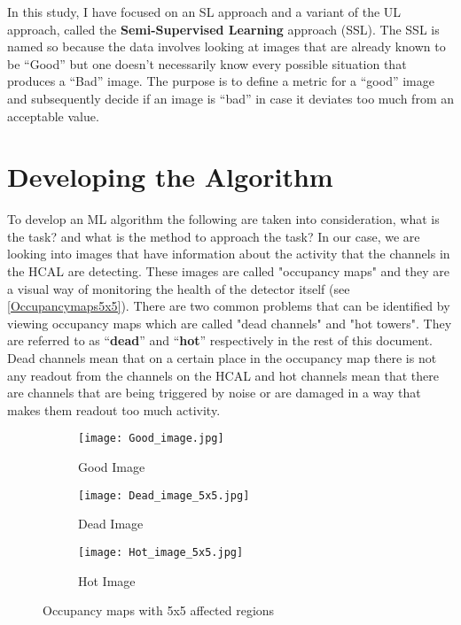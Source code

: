 In this study, I have focused on an SL approach and a variant of the UL approach, called the \textbf{Semi-Supervised Learning} approach (SSL). The SSL is named so because the data involves looking at images that are already known to be “Good” but one doesn’t necessarily know every possible situation that produces a “Bad” image. The purpose is to define a metric for a “good” image and subsequently decide if an image is “bad” in case it deviates too much from an acceptable value.



\section{Developing the Algorithm}

To develop an ML algorithm the following are taken into consideration, what is the task? and what is the method to approach the task? In our case, we are looking into images that have information about the activity that the channels in the HCAL are detecting. These images are called "occupancy maps" and they are a visual way of monitoring the health of the detector itself (see \autoref{Occupancymaps5x5}). There are two common problems that can be identified by viewing occupancy maps which are called "dead channels" and "hot towers". They are referred to as “\textbf{dead}” and “\textbf{hot}” respectively in the rest of this document. Dead channels mean that on a certain place in the occupancy map there is not any readout from the channels on the HCAL and hot channels mean that there are channels that are being triggered by noise or are damaged in a way that makes them readout too much activity.

\begin{figure}[h]
\begin{subfigure}{.3\textwidth}
	\centering
	\texttt{[image: Good\_image.jpg]}
	\caption{Good Image\label{Goodimage}}
\end{subfigure}
%
\begin{subfigure}{.3\linewidth}
	\centering
	\texttt{[image: Dead\_image\_5x5.jpg]}
	\caption{Dead Image \label{Deadimage}}
\end{subfigure}
%
\begin{subfigure}{0.3\linewidth}
	\centering
	\texttt{[image: Hot\_image\_5x5.jpg]}
	\caption{Hot Image \label{Hotimage}}
\end{subfigure}
\vspace{1cm}
\caption{Occupancy maps with 5x5 affected regions \label{Occupancymaps5x5}}
\end{figure}


